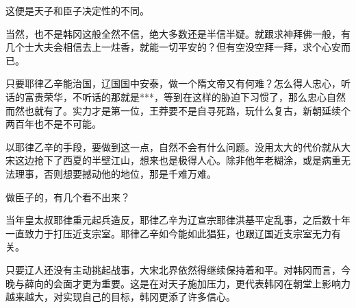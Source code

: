 这便是天子和臣子决定性的不同。 

当然，也不是韩冈这般全然不信，绝大多数还是半信半疑。就跟求神拜佛一般，有几个士大夫会相信去上一炷香，就能一切平安的？但有空没空拜一拜，求个心安而已。 

只要耶律乙辛能治国，辽国国中安泰，做一个隋文帝又有何难？怎么得人忠心，听话的富贵荣华，不听话的那就是***，等到在这样的胁迫下习惯了，那么忠心自然而然也就有了。实力才是第一位，王莽要不是自寻死路，玩什么复古，新朝延续个两百年也不是不可能。 

以耶律乙辛的手段，要做到这一点，自然不会有什么问题。没用太大的代价就从大宋这边抢下了西夏的半壁江山，想来也是极得人心。除非他年老糊涂，或是病重无法理事，否则想要撼动他的地位，那是千难万难。 

做臣子的，有几个看不出来？ 

当年皇太叔耶律重元起兵造反，耶律乙辛为辽宣宗耶律洪基平定乱事，之后数十年一直致力于打压近支宗室。耶律乙辛如今能如此猖狂，也跟辽国近支宗室无力有关。 

只要辽人还没有主动挑起战事，大宋北界依然得继续保持着和平。对韩冈而言，今晚与薛向的会面才更为重要。这是在对天子施加压力，更代表韩冈在朝堂上影响力越来越大，对实现自己的目标，韩冈更添了许多信心。 

